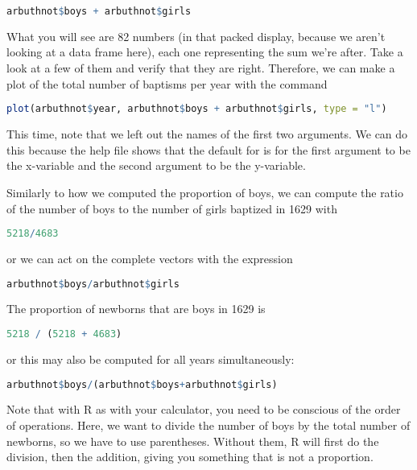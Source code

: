 \documentclass[11pt]{article}
\begin{document}
\begin{lstlisting}[language=R]
arbuthnot$boys + arbuthnot$girls
\end{lstlisting}

What you will see are 82 numbers (in that packed display, because we aren't looking at a data frame here), each one representing the sum we're after. Take a look at a few of them and verify that they are right. Therefore, we can make a plot of the total number of baptisms per year with the command

\begin{lstlisting}[language=R]
plot(arbuthnot$year, arbuthnot$boys + arbuthnot$girls, type = "l")
\end{lstlisting}

This time, note that we left out the names of the first two arguments.  We can do this because the help file shows that the default for  is for the first argument to be the x-variable and the second argument to be the y-variable.

Similarly to how we computed the proportion of boys, we can compute the ratio of the number of boys to the number of girls baptized in 1629 with

\begin{lstlisting}[language=R]
5218/4683
\end{lstlisting}

or we can act on the complete vectors with the expression

\begin{lstlisting}[language=R]
arbuthnot$boys/arbuthnot$girls
\end{lstlisting}

The proportion of newborns that are boys in 1629 is

\begin{lstlisting}[language=R]
5218 / (5218 + 4683)
\end{lstlisting}

or this may also be computed for all years simultaneously:

\begin{lstlisting}[language=R]
arbuthnot$boys/(arbuthnot$boys+arbuthnot$girls)
\end{lstlisting}

Note that with R as with your calculator, you need to be conscious of the order of operations.  Here, we want to divide the number of boys by the total number of newborns, so we have to use parentheses.  Without them, R will first do the division, then the addition, giving you something that is not a proportion.
\end{document}
